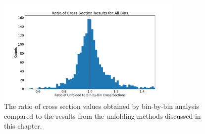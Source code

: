     
    \begin{figure}[H]
        \centering
        \includegraphics[trim={0 0 0 0},clip,width=0.8\textwidth]{Chapters/Ch5-Further/0_IBU/pics/results/binbybin_to_unfolded.png}
        \caption[Summary of Bin-by-Bin vs. Unfolded Cross Sections]{The ratio of cross section values obtained by bin-by-bin analysis compared to the results from the unfolding methods discussed in this chapter.}
        \label{fig:ibufullresult2}
    \end{figure}

